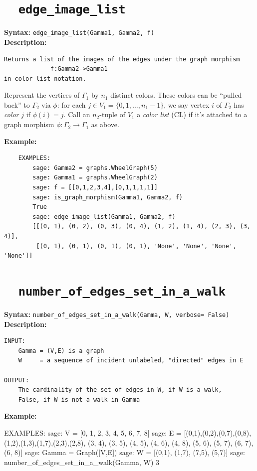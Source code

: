 \documentclass{article}
\begin{document}
\section{\tt \ \  edge\_image\_list}

\textbf{Syntax:} \verb}edge_image_list(Gamma1, Gamma2, f)}\\

\textbf{Description:}
\begin{verbatim}
Returns a list of the images of the edges under the graph morphism 
             f:Gamma2->Gamma1 
in color list notation.

\end{verbatim}

Represent the vertices of $\Gamma_1$ by $n_1$ distinct colors.
These colors can be ``pulled back'' to $\Gamma_2$ via $\phi$:
for each $j \in V_1=\{0,1,\dots,n_1-1\}$, we say
vertex $i$ of $\Gamma_2$ has {\it color} $j$
if $\phi(i)=j$. Call an $n_2$-tuple of $V_1$
a {\it color list} (CL) if it's attached to
a graph morphism $\phi:\Gamma_2\to\Gamma_1$ as above.

\textbf{Example:}
\begin{verbatim}
    EXAMPLES:
        sage: Gamma2 = graphs.WheelGraph(5)
        sage: Gamma1 = graphs.WheelGraph(2)
        sage: f = [[0,1,2,3,4],[0,1,1,1,1]]
        sage: is_graph_morphism(Gamma1, Gamma2, f)
        True
        sage: edge_image_list(Gamma1, Gamma2, f)
        [[(0, 1), (0, 2), (0, 3), (0, 4), (1, 2), (1, 4), (2, 3), (3, 4)],
         [(0, 1), (0, 1), (0, 1), (0, 1), 'None', 'None', 'None', 'None']]
\end{verbatim}

\section{\tt \ \  number\_of\_edges\_set\_in\_a\_walk}

\textbf{Syntax:} \verb}number_of_edges_set_in_a_walk(Gamma, W, verbose= False)}\\

\textbf{Description:}
\begin{verbatim}
INPUT:
    Gamma = (V,E) is a graph
    W     = a sequence of incident unlabeled, "directed" edges in E

OUTPUT: 
    The cardinality of the set of edges in W, if W is a walk,
    False, if W is not a walk in Gamma
\end{verbatim}

\textbf{Example:}
\begin{spverbatim}
    EXAMPLES:
        sage: V = [0, 1, 2, 3, 4, 5, 6, 7, 8]
        sage: E = [(0,1),(0,2),(0,7),(0,8),(1,2),(1,3),(1,7),(2,3),(2,8), (3, 4), (3, 5), (4, 5), (4, 6), (4, 8), (5, 6), (5, 7), (6, 7), (6, 8)]
        sage: Gamma = Graph([V,E])
        sage: W = [(0,1), (1,7), (7,5), (5,7)]
        sage: number_of_edges_set_in_a_walk(Gamma, W)
        3
\end{spverbatim}
\end{document}
